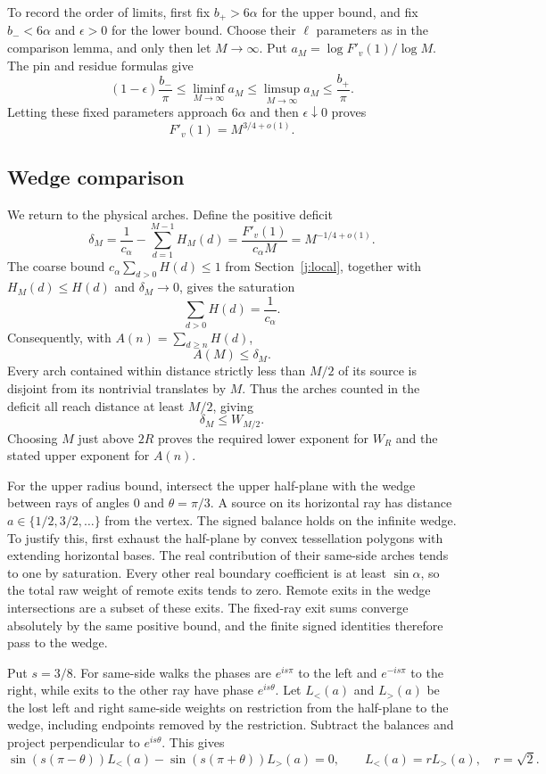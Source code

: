 To record the order of limits, first fix $b_+>6\alpha$ for the upper
bound, and fix $b_-<6\alpha$ and $\epsilon>0$ for the lower bound.
Choose their $\ell$ parameters as in the comparison lemma, and only then
let $M\to\infty$. Put $a_M=\log F'_v(1)/\log M$. The pin and residue
formulas give
\[
 (1-\epsilon)\frac{b_-}{\pi}
 \le\liminf_{M\to\infty}a_M
 \le\limsup_{M\to\infty}a_M
 \le\frac{b_+}{\pi}.
\]
Letting these fixed parameters approach $6\alpha$ and then
$\epsilon\downarrow0$ proves
\begin{equation}\label{j:boundary-increment-exponent}
 F'_v(1)=M^{3/4+o(1)}.
\end{equation}

\subsection{Wedge comparison}\label{j:wedge-comparison}

We return to the physical arches. Define the positive deficit
\[
 \delta_M=\frac1{c_\alpha}-\sum_{d=1}^{M-1}H_M(d)
          =\frac{F'_v(1)}{c_\alpha M}
          =M^{-1/4+o(1)}.
\]
The coarse bound $c_\alpha\sum_{d>0}H(d)\le1$ from
Section~\ref{j:local}, together with $H_M(d)\le H(d)$ and
$\delta_M\to0$, gives the saturation
\[
 \sum_{d>0}H(d)=\frac1{c_\alpha}.
\]
Consequently, with $A(n)=\sum_{d\ge n}H(d)$,
\[
 A(M)\le\delta_M.
\]
Every arch contained within distance strictly less than $M/2$ of its
source is disjoint from its nontrivial translates by $M$. Thus the
arches counted in the deficit all reach distance at least $M/2$, giving
\[
 \delta_M\le W_{M/2}.
\]
Choosing $M$ just above $2R$ proves the required lower exponent for
$W_R$ and the stated upper exponent for $A(n)$.

For the upper radius bound, intersect the upper half-plane with the wedge
between rays of angles $0$ and $\theta=\pi/3$. A source on its horizontal
ray has distance $a\in\{1/2,3/2,\ldots\}$ from the vertex. The signed
balance holds on the infinite wedge. To justify this, first exhaust the
half-plane by convex tessellation polygons with extending horizontal
bases. The real contribution of their same-side arches tends to one by
saturation. Every other real boundary coefficient is at least
$\sin\alpha$, so the total raw weight of remote exits tends to zero.
Remote exits in the wedge intersections are a subset of these exits.
The fixed-ray exit sums converge absolutely by the same positive bound,
and the finite signed identities therefore pass to the wedge.

Put $s=3/8$. For same-side walks the phases are $e^{is\pi}$ to the left
and $e^{-is\pi}$ to the right, while exits to the other ray have phase
$e^{is\theta}$. Let $L_<(a)$ and $L_>(a)$ be the lost left and right
same-side weights on restriction from the half-plane to the wedge,
including endpoints removed by the restriction. Subtract the balances
and project perpendicular to $e^{is\theta}$. This gives
\[
 \sin(s(\pi-\theta))L_<(a)
 -\sin(s(\pi+\theta))L_>(a)=0,
 \qquad L_<(a)=rL_>(a),\quad r=\sqrt2.
\]

